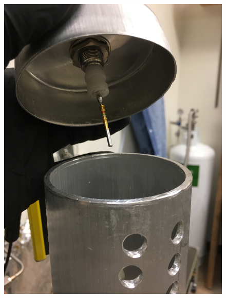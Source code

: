 \begin{figure}[htbp]
\begin{minipage}{0.32\textwidth}
    \includegraphics[width=\linewidth, angle=270]{figures/testbed/ft6_5.jpg}
    \end{minipage}
        \hspace{\fill} %
    \begin{minipage}{0.33\textwidth}

\end{minipage}
\end{figure}
